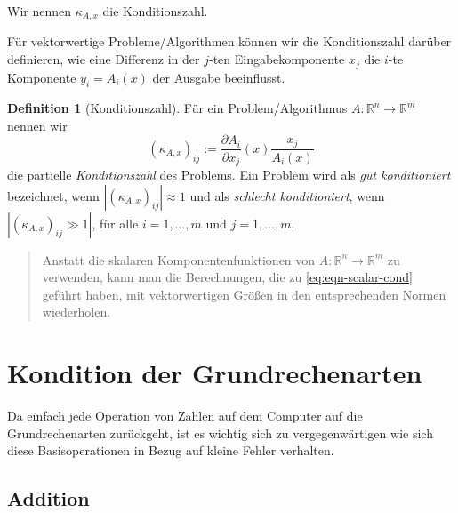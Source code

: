 \documentclass[
]{book}
\newenvironment {JHSAYS} [0] {\begin{quote}\color{jhsc}} {\end{quote}}
\theoremstyle{definition}
\newtheorem{definition}{Definition}[chapter]
\theoremstyle{definition}
\theoremstyle{definition}
\theoremstyle{definition}
\theoremstyle{remark}
\begin{document}
Wir nennen \(\kappa_{A,x}\) die Konditionszahl.

Für vektorwertige Probleme/Algorithmen können wir die Konditionszahl darüber definieren, wie eine Differenz in der \(j\)-ten Eingabekomponente \(x_j\) die \(i\)-te Komponente \(y_i=A_i(x)\) der Ausgabe beeinflusst.

\begin{definition}[Konditionszahl]
\protect\hypertarget{def:condition}{}\label{def:condition}Für ein Problem/Algorithmus \(A\colon \mathbb R^{n}\to \mathbb R^{m}\) nennen wir
\begin{equation*}
(\kappa_{A,x})_{ij} := \frac{\partial A_i}{\partial x_j}(x) \frac{x_j}{A_i(x)}
\end{equation*}
die partielle \emph{Konditionszahl} des Problems. Ein Problem wird als \emph{gut konditioniert} bezeichnet, wenn \(|(\kappa_{A,x})_{ij}|\approx 1\) und als \emph{schlecht konditioniert}, wenn \(|(\kappa_{A,x})_{ij}\gg 1|\), für alle \(i=1,\dotsc,m\) und \(j=1,\dotsc,m\).
\end{definition}

\leavevmode\hypertarget{rem-vector-valued-cond}{}%
\begin{JHSAYS}
Anstatt die skalaren Komponentenfunktionen von \(A\colon \mathbb R^{n} \to \mathbb R^{m}\) zu verwenden, kann man die Berechnungen, die zu \eqref{eq:eqn-scalar-cond} geführt haben, mit vektorwertigen Größen in den entsprechenden Normen wiederholen.

\end{JHSAYS}

\hypertarget{kondition-der-grundrechenarten}{%
\section{Kondition der Grundrechenarten}\label{kondition-der-grundrechenarten}}

Da einfach jede Operation von Zahlen auf dem Computer auf die Grundrechenarten zurückgeht, ist es wichtig sich zu vergegenwärtigen wie sich diese Basisoperationen in Bezug auf kleine Fehler verhalten.

\hypertarget{addition}{%
\subsection{Addition}\label{addition}}
\end{document}
